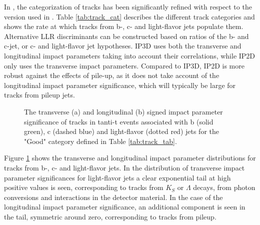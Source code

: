 In \runtwo, the categorization of tracks has been significantly refined with respect to the version used in \runone. Table \ref{tab:track_cat} describes the different track categories and shows the rate at which tracks from b-, c- and light-flavor jets populate them. Alternative LLR discriminants can be constructed based on ratios of the b- and c-jet, or c- and light-flavor jet hypotheses.
IP3D uses both the transverse and longitudinal impact parameters taking into account their correlations, while IP2D only uses the transverse impact parameters. Compared to IP3D, IP2D is more robust against the effects of pile-up, as it does not take account of the longitudinal impact parameter significance, which will typically be large for tracks from pileup jets.
\begin{figure}
\caption{The transverse (a) and longitudinal (b) signed impact parameter significance of tracks in tanti-t events associated with b (solid green), c (dashed blue) and light-flavor (dotted red) jets for the "Good" category defined in Table \ref{tab:track_tab}.}
\label{pic:dz0sig}
\end{figure}
Figure \ref{pic:dz0sig} shows the transverse and longitudinal impact parameter distributions for tracks from b-, c- and light-flavor jets. In the distribution of transverse impact parameter significances for light-flavor jets a clear exponential tail at high positive values is seen, corresponding to tracks from $K_S$ or $\Lambda$ decays, from photon conversions and interactions in the detector material. In the case of the longitudinal impact parameter significance, an additional component is seen in the tail, symmetric around zero, corresponding to tracks from pileup.
